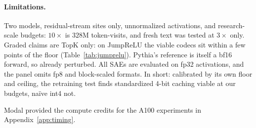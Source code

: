 \documentclass{article}
\begin{document}
\paragraph{Limitations.} Two models, residual-stream sites only,
unnormalized activations, and research-scale budgets: $10\times$ is
$328$M token-visits, and fresh text was tested at $3\times$ only. Graded
claims are TopK only: on JumpReLU the viable codecs sit within a few
points of the floor (Table~\ref{tab:jumprelu}). Pythia's reference is
itself a bf16 forward, so already perturbed. All SAEs are evaluated on
fp32 activations, and the panel omits fp8 and block-scaled formats. In
short: calibrated by its own floor and ceiling, the retraining test
finds standardized 4-bit caching viable at our budgets, na\"ive int4
not.

\clearpage
\begin{ack}
Modal provided the compute credits for the A100 experiments in
Appendix~\ref{app:timing}.
\end{ack}
\end{document}
